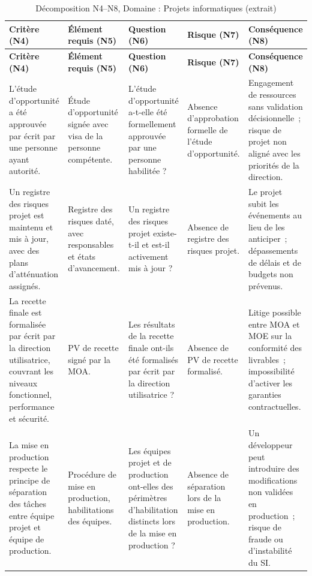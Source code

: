 \small
\begin{longtable}{p{2.8cm}p{2.7cm}p{2.7cm}p{2.4cm}p{2.6cm}}
\caption{Décomposition N4--N8, Domaine : Projets informatiques (extrait)} \\
\toprule
\textbf{Critère (N4)} & \textbf{Élément requis (N5)} & \textbf{Question (N6)} & \textbf{Risque (N7)} & \textbf{Conséquence (N8)} \\
\midrule
\endfirsthead
\toprule
\textbf{Critère (N4)} & \textbf{Élément requis (N5)} & \textbf{Question (N6)} & \textbf{Risque (N7)} & \textbf{Conséquence (N8)} \\
\midrule
\endhead
\bottomrule
\endlastfoot

L'étude d'opportunité a été approuvée par écrit par une personne ayant autorité. &
Étude d'opportunité signée avec visa de la personne compétente. &
L'étude d'opportunité a-t-elle été formellement approuvée par une personne habilitée ? &
Absence d'approbation formelle de l'étude d'opportunité. &
Engagement de ressources sans validation décisionnelle~; risque de projet non aligné avec les priorités de la direction. \\
\addlinespace

Un registre des risques projet est maintenu et mis à jour, avec des plans d'atténuation assignés. &
Registre des risques daté, avec responsables et états d'avancement. &
Un registre des risques projet existe-t-il et est-il activement mis à jour ? &
Absence de registre des risques projet. &
Le projet subit les événements au lieu de les anticiper~; dépassements de délais et de budgets non prévenus. \\
\addlinespace

La recette finale est formalisée par écrit par la direction utilisatrice, couvrant les niveaux fonctionnel, performance et sécurité. &
PV de recette signé par la MOA. &
Les résultats de la recette finale ont-ils été formalisés par écrit par la direction utilisatrice ? &
Absence de PV de recette formalisé. &
Litige possible entre MOA et MOE sur la conformité des livrables~; impossibilité d'activer les garanties contractuelles. \\
\addlinespace

La mise en production respecte le principe de séparation des tâches entre équipe projet et équipe de production. &
Procédure de mise en production, habilitations des équipes. &
Les équipes projet et de production ont-elles des périmètres d'habilitation distincts lors de la mise en production ? &
Absence de séparation lors de la mise en production. &
Un développeur peut introduire des modifications non validées en production~; risque de fraude ou d'instabilité du SI. \\

\end{longtable}


